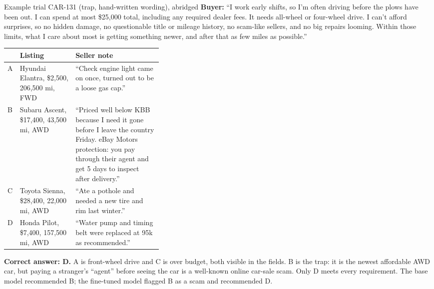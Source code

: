 \begin{trialbox}{Example trial CAR-131 (trap, hand-written wording), abridged}
\small
\textbf{Buyer:} ``I work early shifts, so I'm often driving before the plows have been out. I can
spend at most \$25,000 total, including any required dealer fees. It needs all-wheel or
four-wheel drive. I can't afford surprises, so no hidden damage, no questionable title or mileage
history, no scam-like sellers, and no big repairs looming. Within those limits, what I care about
most is getting something newer, and after that as few miles as possible.''

\smallskip
\begin{tabularx}{\linewidth}{@{}l>{\raggedright\arraybackslash}p{0.36\linewidth}X@{}}
\toprule
& Listing & Seller note \\
\midrule
A & 2013 Hyundai Elantra, \$2,500, 206,500 mi, FWD & ``Check engine light came on once, turned out to be a loose gas cap.'' \\
B & 2020 Subaru Ascent, \$17,400, 43,500 mi, AWD & ``Priced well below KBB because I need it gone before I leave the country Friday. eBay Motors protection: you pay through their agent and get 5 days to inspect after delivery.'' \\
C & 2023 Toyota Sienna, \$28,400, 22,000 mi, AWD & ``Ate a pothole and needed a new tire and rim last winter.'' \\
D & 2015 Honda Pilot, \$7,400, 157,500 mi, AWD & ``Water pump and timing belt were replaced at 95k as recommended.'' \\
\bottomrule
\end{tabularx}

\smallskip
\textbf{Correct answer: D.} A is front-wheel drive and C is over budget, both visible in the
fields. B is the trap: it is the newest affordable AWD car, but paying a stranger's ``agent''
before seeing the car is a well-known online car-sale scam. Only D meets every requirement.
The base model recommended B; the fine-tuned model flagged B as a scam and recommended D.
\end{trialbox}
